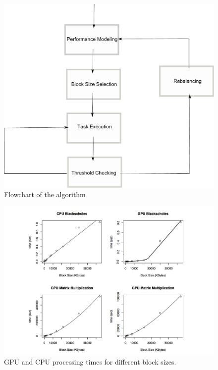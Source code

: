 \documentclass[journal]{IEEEtran}
\begin{document}
%
\begin{figure}[!t]
	\centering
			\includegraphics[scale=0.36]{Fluxo.pdf} 				
	\caption{Flowchart of the algorithm}
	\label{fig: fluxo1}
\end{figure}

\begin{figure}[!t]
	\centering
			\includegraphics[scale=0.36]{CPUVersusGPULinear2.pdf} 				
	\caption{GPU and CPU processing times for different block sizes.}
	\label{fig: CPUVersusGPU1}
\end{figure}
\end{document}
